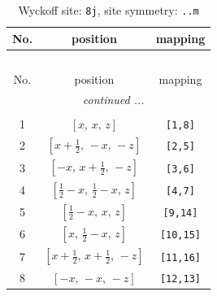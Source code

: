 \documentclass[fleqn,8pt]{jsarticle}
\begin{document}
\begin{longtable}{ccc}
\caption{Wyckoff site: {\tt 8j}, site symmetry: {\tt ..m}}
 \\
 \hline \hline
No. & position & mapping \\ \hline \endfirsthead

\multicolumn{2}{l}{\tablename\ \thetable{}} \\
 \hline \hline
No. & position & mapping \\ \hline \endhead

 \hline \hline
\multicolumn{2}{r}{\footnotesize\it continued ...} \\ \endfoot

 \hline \hline
\multicolumn{2}{r}{} \\ \endlastfoot

1 & $\left[ x,\, x,\, z \right]$ & {\tt [1,8]} \\ \hline
2 & $\left[ x + \frac{1}{2},\, - x,\, - z \right]$ & {\tt [2,5]} \\ \hline
3 & $\left[ - x,\, x + \frac{1}{2},\, - z \right]$ & {\tt [3,6]} \\ \hline
4 & $\left[ \frac{1}{2} - x,\, \frac{1}{2} - x,\, z \right]$ & {\tt [4,7]} \\ \hline
5 & $\left[ \frac{1}{2} - x,\, x,\, z \right]$ & {\tt [9,14]} \\ \hline
6 & $\left[ x,\, \frac{1}{2} - x,\, z \right]$ & {\tt [10,15]} \\ \hline
7 & $\left[ x + \frac{1}{2},\, x + \frac{1}{2},\, - z \right]$ & {\tt [11,16]} \\ \hline
8 & $\left[ - x,\, - x,\, - z \right]$ & {\tt [12,13]} \\
\end{longtable}
\renewcommand{\arraystretch}{1.2}
\end{document}
